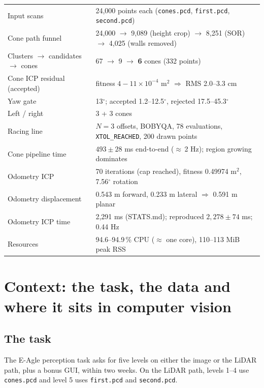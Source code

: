 \documentclass[10pt,a4paper]{scrartcl}
\newcommand{\code}[1]{\texttt{#1}}
\newcommand{\RuleSection}[1]{%
    \section{#1}%
    \vspace{0.2em}{\color{accent!35}\hrule height 0.4pt}\vspace{0.3em}%
  }
\begin{document}
  \begin{keybox}
  \small
  \begin{tabularx}{\linewidth}{@{}L{5.6cm} X@{}}
  Input scans & 24,000 points each (\code{cones.pcd}, \code{first.pcd}, \code{second.pcd}) \\
  Cone path funnel & 24,000 $\to$ 9,089 (height crop) $\to$ 8,251 (SOR) $\to$ 4,025 (walls removed) \\
  Clusters $\to$ candidates $\to$ cones & 67 $\to$ 9 $\to$ \textbf{6} cones (332 points) \\
  Cone ICP residual (accepted) & fitness $4\!-\!11\times10^{-4}$ m$^2$ $\Rightarrow$ RMS 2.0--3.3 cm \\
  Yaw gate & 13$^\circ$; accepted 1.2--12.5$^\circ$, rejected 17.5--45.3$^\circ$ \\
  Left / right & 3 + 3 cones \\
  Racing line & $N=3$ offsets, BOBYQA, 78 evaluations, \code{XTOL\_REACHED}, 200 drawn points \\
  Cone pipeline time & $493\pm28$ ms end-to-end ($\approx$\,2 Hz); region growing dominates \\
  Odometry ICP & 70 iterations (cap reached), fitness 0.49974 m$^2$, 7.56$^\circ$ rotation \\
  Odometry displacement & 0.543 m forward, 0.233 m lateral $\Rightarrow$ 0.591 m planar \\
  Odometry ICP time & 2,291 ms (STATS.md); reproduced $2{,}278\pm74$ ms; 0.44 Hz \\
  Resources & 94.6--94.9\,\% CPU ($\approx$ one core), 110--113 MiB peak RSS \\
  \end{tabularx}
  \end{keybox}

  \RuleSection{Context: the task, the data and where it sits in computer vision}
  \label{sec:context}

  \subsection{The task}

  The E-Agle perception task asks for five levels on either the image or the LiDAR
  path, plus a bonus GUI, within two weeks. On the LiDAR path, levels 1--4 use
  \code{cones.pcd} and level 5 uses \code{first.pcd} and \code{second.pcd}.
\end{document}
